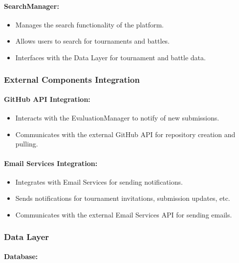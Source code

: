 \documentclass{article}
\begin{document}
\paragraph{SearchManager:}

\begin{itemize}
    \item Manages the search functionality of the platform.
    \item Allows users to search for tournaments and battles.
    \item Interfaces with the Data Layer for tournament and battle data.
\end{itemize}

\subsubsection*{External Components Integration}

\paragraph{GitHub API Integration:}

\begin{itemize}
    \item Interacts with the EvaluationManager to notify of new submissions.
    \item Communicates with the external GitHub API for repository creation and pulling.
\end{itemize}

\paragraph{Email Services Integration:}

\begin{itemize}
    \item Integrates with Email Services for sending notifications.
    \item Sends notifications for tournament invitations, submission updates, etc.
    \item Communicates with the external Email Services API for sending emails.
\end{itemize}

\subsubsection{Data Layer}

\paragraph{Database:}
\end{document}
